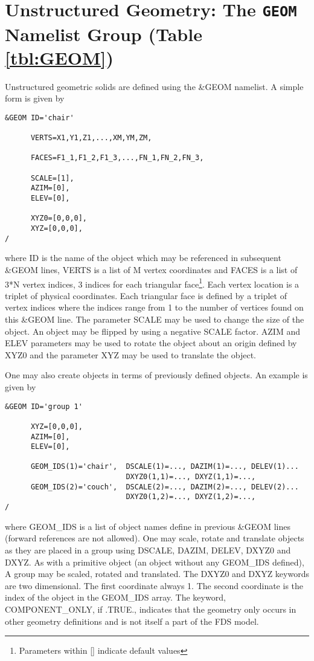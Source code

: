 \documentclass[12pt]{article}
\begin{document}
\vspace{1.0in}
\section{Unstructured Geometry: The \texorpdfstring{{\tt GEOM}}{GEOM} Namelist Group (Table \ref{tbl:GEOM})}
\label{info:GEOM}

Unstructured geometric solids are defined using the \&GEOM namelist.
A simple form is given by

\begin{verbatim}
&GEOM ID='chair'

      VERTS=X1,Y1,Z1,...,XM,YM,ZM,

      FACES=F1_1,F1_2,F1_3,...,FN_1,FN_2,FN_3,

      SCALE=[1],
      AZIM=[0],
      ELEV=[0],

      XYZ0=[0,0,0],
      XYZ=[0,0,0],
/
\end{verbatim}

\noindent where ID is the name of the object which may be referenced in subsequent \&GEOM lines, VERTS is a list of M vertex coordinates and FACES is a list of 3*N vertex indices, 3 indices for each triangular face\footnote{Parameters within [] indicate default values}.  Each vertex location is a triplet of physical coordinates.  Each triangular face is defined by a triplet of vertex indices where the indices range from 1 to the number of vertices found on this \&GEOM line. The parameter SCALE may be used to change the size of the object. An object may be flipped by using a negative SCALE factor.  AZIM and ELEV parameters may be used to rotate the object about an origin defined by XYZ0 and the parameter XYZ may be used to translate the object.

One may also create objects in terms of previously defined objects.  An example is given by

{%
\begin{verbatim}
&GEOM ID='group 1'

      XYZ=[0,0,0],
      AZIM=[0],
      ELEV=[0],

      GEOM_IDS(1)='chair',  DSCALE(1)=..., DAZIM(1)=..., DELEV(1)... 
                            DXYZ0(1,1)=..., DXYZ(1,1)=...,
      GEOM_IDS(2)='couch',  DSCALE(2)=..., DAZIM(2)=..., DELEV(2)... 
                            DXYZ0(1,2)=..., DXYZ(1,2)=...,
/
\end{verbatim}
}

\noindent where GEOM\_IDS is a list of object names define in previous \&GEOM lines (forward references are not allowed).   One may scale, rotate and translate objects as they are placed in a group using DSCALE, DAZIM, DELEV, DXYZ0 and DXYZ.  As with a primitive object (an object without any GEOM\_IDS defined), A group may be scaled, rotated and translated. The DXYZ0 and DXYZ keywords are two dimensional.  The first coordinate always 1.  The second coordinate is the index of the object in the GEOM\_IDS array. The keyword, COMPONENT\_ONLY, if .TRUE., indicates that the geometry only occurs in other geometry definitions and is not itself a part of the FDS model.
\end{document}
